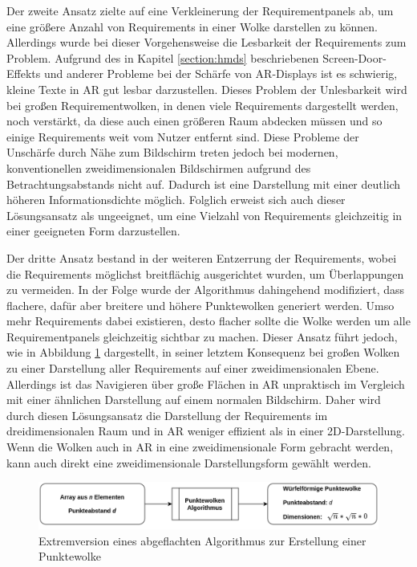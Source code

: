 Der zweite Ansatz zielte auf eine Verkleinerung der Requirementpanels ab, um eine größere Anzahl von Requirements in einer Wolke darstellen zu können.
Allerdings wurde bei dieser Vorgehensweise die Lesbarkeit der Requirements zum Problem.
Aufgrund des in Kapitel \ref{section:hmds} beschriebenen Screen-Door-Effekts und anderer Probleme bei der Schärfe von AR-Displays ist es schwierig, kleine Texte in AR gut lesbar darzustellen.
Dieses Problem der Unlesbarkeit wird bei großen Requirementwolken, in denen viele Requirements dargestellt werden, noch verstärkt, da diese auch einen größeren Raum abdecken müssen und so einige Requirements weit vom Nutzer entfernt sind.
Diese Probleme der Unschärfe durch Nähe zum Bildschirm treten jedoch bei modernen, konventionellen zweidimensionalen Bildschirmen aufgrund des Betrachtungsabstands nicht auf.
Dadurch ist eine Darstellung mit einer deutlich höheren Informationsdichte möglich.
Folglich erweist sich auch dieser Lösungsansatz als ungeeignet, um eine Vielzahl von Requirements gleichzeitig in einer geeigneten Form darzustellen.

Der dritte Ansatz bestand in der weiteren Entzerrung der Requirements, wobei die Requirements möglichst breitflächig ausgerichtet wurden, um Überlappungen zu vermeiden.
In der Folge wurde der Algorithmus dahingehend modifiziert, dass flachere, dafür aber breitere und höhere Punktewolken generiert werden.
Umso mehr Requirements dabei existieren, desto flacher sollte die Wolke werden um alle Requirementpanels gleichzeitig sichtbar zu machen.
Dieser Ansatz führt jedoch, wie in Abbildung \ref{fig:wolken-algo-ang2} dargestellt, in seiner letztem Konsequenz bei großen Wolken zu einer Darstellung aller Requirements auf einer zweidimensionalen Ebene.
Allerdings ist das Navigieren über große Flächen in AR unpraktisch im Vergleich mit einer ähnlichen Darstellung auf einem normalen Bildschirm.
Daher wird durch diesen Lösungsansatz die Darstellung der Requirements im dreidimensionalen Raum und in AR weniger effizient als in einer 2D-Darstellung.
Wenn die Wolken auch in AR in eine zweidimensionale Form gebracht werden, kann auch direkt eine zweidimensionale Darstellungsform gewählt werden.

\begin{figure}[H]
    \centering
    \includegraphics[width=1\textwidth]{images/WolkenAlgoAngepasst2.png}
    \caption{Extremversion eines abgeflachten Algorithmus zur Erstellung einer Punktewolke}
    \label{fig:wolken-algo-ang2}
\end{figure}

